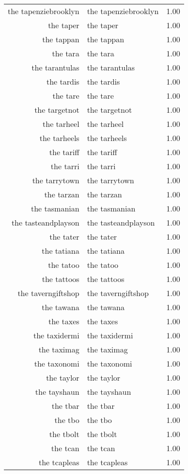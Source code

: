 \begin{table}[ht]
\begin{tabular}{rlr}
  the tapenziebrooklyn & the tapenziebrooklyn & 1.00 \\ 
  the taper & the taper & 1.00 \\ 
  the tappan & the tappan & 1.00 \\ 
  the tara & the tara & 1.00 \\ 
  the tarantulas & the tarantulas & 1.00 \\ 
  the tardis & the tardis & 1.00 \\ 
  the tare & the tare & 1.00 \\ 
  the targetnot & the targetnot & 1.00 \\ 
  the tarheel & the tarheel & 1.00 \\ 
  the tarheels & the tarheels & 1.00 \\ 
  the tariff & the tariff & 1.00 \\ 
  the tarri & the tarri & 1.00 \\ 
  the tarrytown & the tarrytown & 1.00 \\ 
  the tarzan & the tarzan & 1.00 \\ 
  the tasmanian & the tasmanian & 1.00 \\ 
  the tasteandplayson & the tasteandplayson & 1.00 \\ 
  the tater & the tater & 1.00 \\ 
  the tatiana & the tatiana & 1.00 \\ 
  the tatoo & the tatoo & 1.00 \\ 
  the tattoos & the tattoos & 1.00 \\ 
  the taverngiftshop & the taverngiftshop & 1.00 \\ 
  the tawana & the tawana & 1.00 \\ 
  the taxes & the taxes & 1.00 \\ 
  the taxidermi & the taxidermi & 1.00 \\ 
  the taximag & the taximag & 1.00 \\ 
  the taxonomi & the taxonomi & 1.00 \\ 
  the taylor & the taylor & 1.00 \\ 
  the tayshaun & the tayshaun & 1.00 \\ 
  the tbar & the tbar & 1.00 \\ 
  the tbo & the tbo & 1.00 \\ 
  the tbolt & the tbolt & 1.00 \\ 
  the tcan & the tcan & 1.00 \\ 
  the tcapleas & the tcapleas & 1.00 \\ 

\end{tabular}
\end{table}
